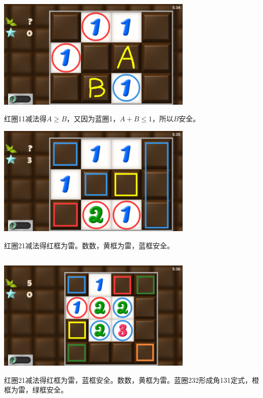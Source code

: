 \subsection{} %
\begin{center}
    \includegraphics[width=0.7\textwidth]{puzzle/61-1.png}
\end{center}
红圈11减法得$A\ge B$，又因为蓝圈1，$A+B\le 1$，所以$B$安全。
\begin{center}
    \includegraphics[width=0.7\textwidth]{puzzle/61-2.png}
\end{center}
红圈21减法得红框为雷。数数，黄框为雷，蓝框安全。

\subsection{} %
\begin{center}
    \includegraphics[width=0.7\textwidth]{puzzle/62-1.png}
\end{center}
红圈21减法得红框为雷，蓝框安全。数数，黄框为雷。蓝圈232形成角131定式，橙框为雷，绿框安全。

